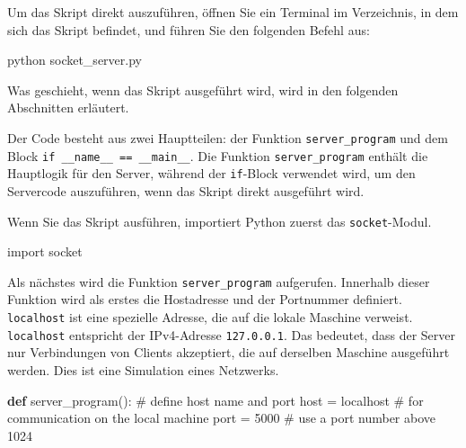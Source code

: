 \documentclass[
  nswissgerman,
  a4paper,
  DIV=11,
  numbers=noendperiod,
  ngerman]{scrreprt}
\newenvironment{Shaded}{\begin{snugshade}}{\end{snugshade}}
\newcommand{\CommentTok}[1]{\textcolor[rgb]{0.37,0.37,0.37}{#1}}
\newcommand{\DecValTok}[1]{\textcolor[rgb]{0.68,0.00,0.00}{#1}}
\newcommand{\ExtensionTok}[1]{\textcolor[rgb]{0.00,0.23,0.31}{#1}}
\newcommand{\ImportTok}[1]{\textcolor[rgb]{0.00,0.46,0.62}{#1}}
\newcommand{\KeywordTok}[1]{\textcolor[rgb]{0.00,0.23,0.31}{\textbf{#1}}}
\newcommand{\NormalTok}[1]{\textcolor[rgb]{0.00,0.23,0.31}{#1}}
\newcommand{\OperatorTok}[1]{\textcolor[rgb]{0.37,0.37,0.37}{#1}}
\newcommand{\StringTok}[1]{\textcolor[rgb]{0.13,0.47,0.30}{#1}}
\begin{document}
Um das Skript direkt auszuführen, öffnen Sie ein Terminal im
Verzeichnis, in dem sich das Skript befindet, und führen Sie den
folgenden Befehl aus:

\begin{Shaded}
\begin{Highlighting}[numbers=left,,]
\ExtensionTok{python}\NormalTok{ socket\_server.py}
\end{Highlighting}
\end{Shaded}

Was geschieht, wenn das Skript ausgeführt wird, wird in den folgenden
Abschnitten erläutert.

Der Code besteht aus zwei Hauptteilen: der Funktion
\texttt{server\_program} und dem Block
\texttt{if\ \_\_name\_\_\ ==\ \textquotesingle{}\_\_main\_\_\textquotesingle{}}.
Die Funktion \texttt{server\_program} enthält die Hauptlogik für den
Server, während der \texttt{if}-Block verwendet wird, um den Servercode
auszuführen, wenn das Skript direkt ausgeführt wird.

Wenn Sie das Skript ausführen, importiert Python zuerst das
\texttt{socket}-Modul.

\begin{Shaded}
\begin{Highlighting}[numbers=left,,]
\ImportTok{import}\NormalTok{ socket}
\end{Highlighting}
\end{Shaded}

Als nächstes wird die Funktion \texttt{server\_program} aufgerufen.
Innerhalb dieser Funktion wird als erstes die Hostadresse und der
Portnummer definiert. \texttt{localhost} ist eine spezielle Adresse, die
auf die lokale Maschine verweist. \texttt{localhost} entspricht der
IPv4-Adresse \texttt{127.0.0.1}. Das bedeutet, dass der Server nur
Verbindungen von Clients akzeptiert, die auf derselben Maschine
ausgeführt werden. Dies ist eine Simulation eines Netzwerks.

\begin{Shaded}
\begin{Highlighting}[numbers=left,,]
\KeywordTok{def}\NormalTok{ server\_program():}
    \CommentTok{\# define host name and port}
\NormalTok{    host }\OperatorTok{=} \StringTok{\textquotesingle{}localhost\textquotesingle{}}    \CommentTok{\# for communication on the local machine}
\NormalTok{    port }\OperatorTok{=} \DecValTok{5000}           \CommentTok{\# use a port number above 1024}
\end{Highlighting}
\end{Shaded}
\end{document}
